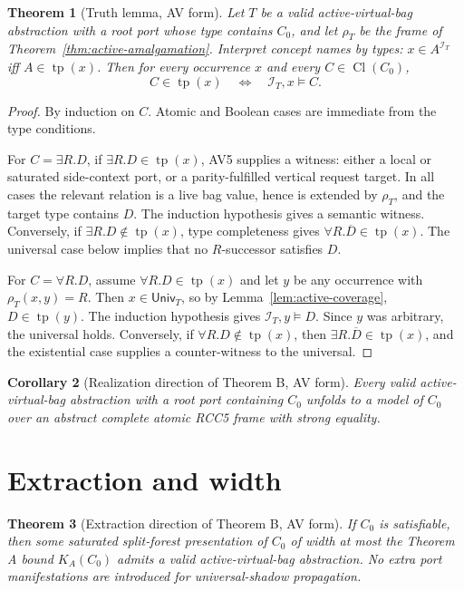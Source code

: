 \documentclass[11pt]{article}
\newtheorem{theorem}{Theorem}[section]
\newtheorem{corollary}[theorem]{Corollary}
\newcommand{\Cl}{\operatorname{Cl}}
\newcommand{\tp}{\operatorname{tp}}
\newcommand{\Univ}{\mathsf{Univ}}
\begin{document}
\begin{theorem}[Truth lemma, AV form]\label{thm:truth}
Let \(T\) be a valid active-virtual-bag abstraction with a root port whose type
contains \(C_0\), and let \(\rho_T\) be the frame of
Theorem~\ref{thm:active-amalgamation}.  Interpret concept names by types:
\(x\in A^{\mathcal I_T}\) iff \(A\in\tp(x)\).  Then for every occurrence \(x\)
and every \(C\in\Cl(C_0)\),
\[
  C\in\tp(x)\quad\Longleftrightarrow\quad \mathcal I_T,x\models C.
\]
\end{theorem}

\begin{proof}
By induction on \(C\).  Atomic and Boolean cases are immediate from the type
conditions.

For \(C=\exists R.D\), if \(\exists R.D\in\tp(x)\), AV5 supplies a witness:
either a local or saturated side-context port, or a parity-fulfilled vertical
request target.  In all cases the relevant relation is a live bag value, hence
is extended by \(\rho_T\), and the target type contains \(D\).  The induction
hypothesis gives a semantic witness.  Conversely, if
\(\exists R.D\notin\tp(x)\), type completeness gives
\(\forall R.\overline D\in\tp(x)\).  The universal case below implies that no
\(R\)-successor satisfies \(D\).

For \(C=\forall R.D\), assume \(\forall R.D\in\tp(x)\) and let
\(y\) be any occurrence with \(\rho_T(x,y)=R\).  Then \(x\in\Univ_T\), so by
Lemma~\ref{lem:active-coverage}, \(D\in\tp(y)\).  The induction hypothesis gives
\(\mathcal I_T,y\models D\).  Since \(y\) was arbitrary, the universal holds.
Conversely, if \(\forall R.D\notin\tp(x)\), then
\(\exists R.\overline D\in\tp(x)\), and the existential case supplies a
counter-witness to the universal.
\end{proof}

\begin{corollary}[Realization direction of Theorem B, AV form]
Every valid active-virtual-bag abstraction with a root port containing \(C_0\)
unfolds to a model of \(C_0\) over an abstract complete atomic RCC5 frame with
strong equality.
\end{corollary}

\section{Extraction and width}

\begin{theorem}[Extraction direction of Theorem B, AV form]\label{thm:extract}
If \(C_0\) is satisfiable, then some saturated split-forest presentation of
\(C_0\) of width at most the Theorem A bound \(K_A(C_0)\) admits a valid
active-virtual-bag abstraction.  No extra port manifestations are introduced
for universal-shadow propagation.
\end{theorem}
\end{document}
